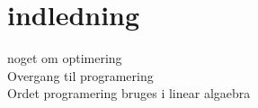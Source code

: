 \chapter{indledning}
noget om optimering\\
Overgang til programering\\
Ordet programering bruges i linear algaebra